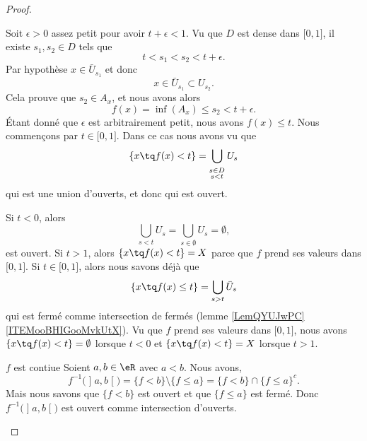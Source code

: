 \begin{proof}
\begin{subproof}
        Soit \( \epsilon>0\) assez petit pour avoir \( t+\epsilon<1\). Vu que \( D\) est dense dans \( \mathopen[ 0 , 1 \mathclose]\), il existe \( s_1,s_2\in D\) tels que
        \begin{equation}
            t<s_1<s_2<t+\epsilon.
        \end{equation}
        Par hypothèse \( x\in \bar U_{s_1}\) et donc
        \begin{equation}
            x\in \bar U_{s_1}\subset U_{s_2}.
        \end{equation}
        Cela prouve que \( s_2\in A_x\), et nous avons alors
        \begin{equation}
            f(x)=\inf(A_x)\leq s_2<t+\epsilon.
        \end{equation}
        Étant donné que \( \epsilon\) est arbitrairement petit, nous avons \( f(x)\leq t\).
        Nous commençons par \( t\in \mathopen[ 0 , 1 \mathclose]\). Dans ce cas nous avons vu que
        \begin{equation}
            \{ x\tq f(x)<t \}=\bigcup_{_{\substack{s\in D\\s<t}}}U_s
        \end{equation}
        qui est une union d'ouverts, et donc qui est ouvert.

        Si \( t<0\), alors
        \begin{equation}
            \bigcup_{s<t}U_s=\bigcup_{s\in\emptyset}U_s=\emptyset,
        \end{equation}
        est ouvert. Si \( t>1\), alors \( \{ x\tq f(x)<t \}=X\) parce que \( f\) prend ses valeurs dans \( \mathopen[ 0 , 1 \mathclose]\).
        Si \( t\in\mathopen[ 0 , 1 \mathclose]\), alors nous savons déjà que
        \begin{equation}
            \{ x\tq f(x)\leq t \}=\bigcup_{s>t}\bar U_s
        \end{equation}
        qui est fermé comme intersection de fermés (lemme \ref{LemQYUJwPC}\ref{ITEMooBHIGooMvkUtX}). Vu que \( f\) prend ses valeurs dans \( \mathopen[ 0 , 1 \mathclose]\), nous avons \( \{ x\tq f(x)<t \}=\emptyset\) lorsque \( t<0\) et \( \{ x\tq f(x)<t \}=X\) lorsque \( t>1\).
    \item[\( f\) est contiue]
        Soient \( a,b\in \eR\) avec \( a<b\). Nous avons, 
        \begin{equation}
            f^{-1}\big( \mathopen] a , b \mathclose[ \big)=\{ f<b \}\setminus\{ f\leq a \}=\{ f<b \}\cap \{ f\leq a \}^c.
        \end{equation}
        Mais nous savons que \( \{ f<b \}\) est ouvert et que \( \{ f\leq a \}\) est fermé. Donc \( f^{-1}\big( \mathopen] a , b \mathclose[ \big)\) est ouvert comme intersection d'ouverts.


\end{subproof}
\end{proof}
